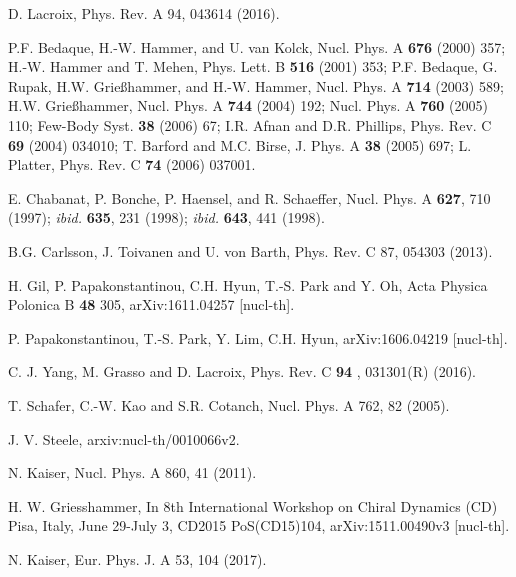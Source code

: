 \documentclass[aps,11pt,prc,preprint,superscriptaddress,nofootinbib]{revtex4}
\begin{document}
\begin{thebibliography}{99}
 D. Lacroix, Phys. Rev. A 94, 043614 (2016).

 P.F. Bedaque, H.-W. Hammer, and U. van Kolck, Nucl. Phys. A \textbf{676} (2000) 357; H.-W.
Hammer and T. Mehen, Phys. Lett. B \textbf{516} (2001) 353; P.F. Bedaque, G. Rupak, H.W.
Grießhammer, and H.-W. Hammer, Nucl. Phys. A \textbf{714} (2003) 589; H.W. Grießhammer, Nucl.
Phys. A \textbf{744} (2004) 192; Nucl. Phys. A \textbf{760} (2005) 110; Few-Body Syst. \textbf{38} (2006) 67; I.R.
Afnan and D.R. Phillips, Phys. Rev. C \textbf{69} (2004) 034010; T. Barford and M.C. Birse, J. Phys.
A \textbf{38} (2005) 697; L. Platter, Phys. Rev. C \textbf{74} (2006) 037001.


 E. Chabanat, P. Bonche, P. Haensel, and R. Schaeffer, Nucl.
Phys. A \textbf{627}, 710 (1997); \textit{ibid.} \textbf{635}, 231 (1998); 
\textit{ibid.} \textbf{643}, 441 (1998).


 B.G. Carlsson, J. Toivanen and U. von Barth, Phys. Rev. C 87, 054303 (2013).

 H. Gil, P. Papakonstantinou, C.H. Hyun, T.-S. Park and Y. Oh, Acta Physica Polonica B \textbf{48} 305, arXiv:1611.04257 [nucl-th].

 P. Papakonstantinou, T.-S. Park, Y. Lim, C.H. Hyun, arXiv:1606.04219 [nucl-th].

 C. J. Yang, M. Grasso and D. Lacroix, Phys. Rev. C \textbf{94}%
, 031301(R) (2016).

 T. Schafer, C.-W. Kao and S.R. Cotanch, Nucl. Phys. A
762, 82 (2005).

 J. V. Steele, arxiv:nucl-th/0010066v2.

 N. Kaiser, Nucl. Phys. A 860, 41 (2011).

 H. W. Griesshammer, In 8th International Workshop on Chiral Dynamics (CD) Pisa, Italy, June 29-July 3, CD2015 PoS(CD15)104, arXiv:1511.00490v3 [nucl-th].




 N. Kaiser, Eur. Phys. J. A 53, 104 (2017). 

\end{thebibliography}
\end{document}
